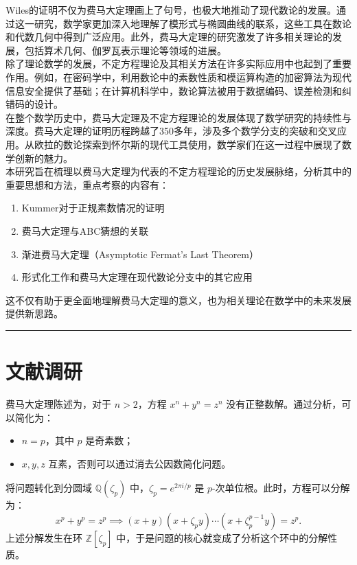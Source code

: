 \documentclass{article}
\begin{document}
\noindent
Wiles的证明不仅为费马大定理画上了句号，也极大地推动了现代数论的发展。通过这一研究，数学家更加深入地理解了模形式与椭圆曲线的联系，这些工具在数论和代数几何中得到广泛应用。此外，费马大定理的研究激发了许多相关理论的发展，包括算术几何、伽罗瓦表示理论等领域的进展。\\

\noindent
除了理论数学的发展，不定方程理论及其相关方法在许多实际应用中也起到了重要作用。例如，在密码学中，利用数论中的素数性质和模运算构造的加密算法为现代信息安全提供了基础；在计算机科学中，数论算法被用于数据编码、误差检测和纠错码的设计。\\

\noindent
在整个数学历史中，费马大定理及不定方程理论的发展体现了数学研究的持续性与深度。费马大定理的证明历程跨越了350多年，涉及多个数学分支的突破和交叉应用。从欧拉的数论探索到怀尔斯的现代工具使用，数学家们在这一过程中展现了数学创新的魅力。\\

\noindent
本研究旨在梳理以费马大定理为代表的不定方程理论的历史发展脉络，分析其中的重要思想和方法，重点考察的内容有：
\begin{enumerate}
\item Kummer对于正规素数情况的证明
\item 费马大定理与ABC猜想的关联
\item 渐进费马大定理（Asymptotic Fermat's Last Theorem）
\item 形式化工作和费马大定理在现代数论分支中的其它应用
\end{enumerate}
这不仅有助于更全面地理解费马大定理的意义，也为相关理论在数学中的未来发展提供新思路。

\newpage
\hrule
\part{文献调研}

\noindent
费马大定理陈述为，对于 $n > 2$，方程 $x^n + y^n = z^n$ 没有正整数解。通过分析，可以简化为：
\begin{itemize}
    \item $n=p$，其中 $p$ 是奇素数；
    \item $x,y,z$ 互素，否则可以通过消去公因数简化问题。
\end{itemize}

\noindent
将问题转化到分圆域 $\mathbb{Q}(\zeta_p)$ 中，$\zeta_p = e^{2\pi i / p}$ 是 $p$-次单位根。此时，方程可以分解为：
$$
x^p + y^p = z^p \implies (x+y)(x+\zeta_p y)\cdots(x+\zeta_p^{p-1}y) = z^p.
$$
上述分解发生在环 $\mathbb{Z}[\zeta_p]$ 中，于是问题的核心就变成了分析这个环中的分解性质。
\end{document}
